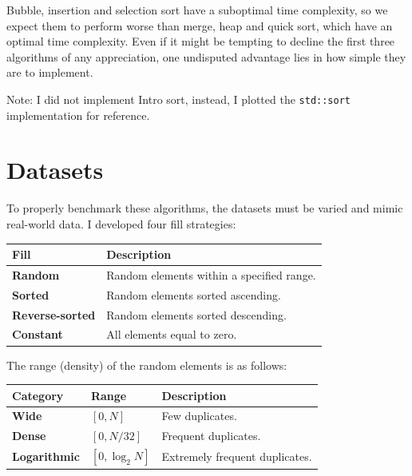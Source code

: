 \documentclass[11pt, a4paper]{article}
\begin{document}
Bubble, insertion and selection sort have a suboptimal time complexity, so we expect them to perform worse than merge, heap and quick sort, which have an optimal time complexity. Even if it might be tempting to decline the first three algorithms of any appreciation, one undisputed advantage lies in how simple they are to implement.

Note: I did not implement Intro sort, instead, I plotted the \texttt{std::sort} implementation for reference.


\newpage
\section{Datasets}
To properly benchmark these algorithms, the datasets must be varied and mimic real-world data. I developed four fill strategies:
\begin{center}
\setlength{\tabcolsep}{12pt}
\begin{tabularx}{0.8\textwidth}{lX}
    \toprule
    \textbf{Fill}           & \textbf{Description} \\
    \midrule
    \textbf{Random}         & Random elements within a specified range. \\
    \textbf{Sorted}         & Random elements sorted ascending. \\
    \textbf{Reverse-sorted} & Random elements sorted descending. \\
    \textbf{Constant}       & All elements equal to zero. \\
    \bottomrule
\end{tabularx}
\end{center}

\medskip

The range (density) of the random elements is as follows:
\begin{center}
\setlength{\tabcolsep}{12pt}
\begin{tabularx}{0.8\textwidth}{llX}
    \toprule
    \textbf{Category}    & \textbf{Range} & \textbf{Description} \\
    \midrule
    \textbf{Wide}        & $[0, N]$        & Few duplicates. \\
    \textbf{Dense}       & $[0, N/32]$     & Frequent duplicates. \\
    \textbf{Logarithmic} & $[0, \log_2 N]$ & Extremely frequent duplicates. \\
    \bottomrule
\end{tabularx}
\end{center}
\end{document}
